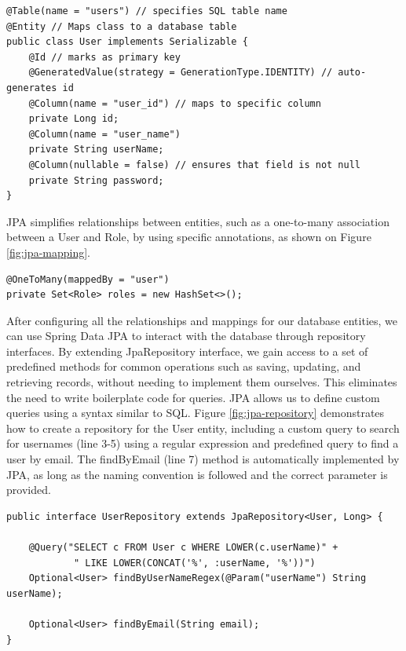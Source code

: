 {
\begin{verbatim}
@Table(name = "users") // specifies SQL table name
@Entity // Maps class to a database table
public class User implements Serializable {
    @Id // marks as primary key
    @GeneratedValue(strategy = GenerationType.IDENTITY) // auto-generates id
    @Column(name = "user_id") // maps to specific column
    private Long id;
    @Column(name = "user_name")
    private String userName;
    @Column(nullable = false) // ensures that field is not null
    private String password;
}
\end{verbatim}
\label{fig:jpa-table}
}

JPA simplifies relationships between entities, such as a one-to-many association between a User and Role, by using specific annotations, as shown on Figure \ref{fig:jpa-mapping}.
{
\begin{verbatim}
@OneToMany(mappedBy = "user")
private Set<Role> roles = new HashSet<>();
\end{verbatim}
\label{fig:jpa-mapping}
}

After configuring all the relationships and mappings for our database entities, we can use Spring Data JPA to interact with the database through repository interfaces. By extending JpaRepository interface, we gain access to a set of predefined methods for common operations such as saving, updating, and retrieving records, without needing to implement them ourselves. This eliminates the need to write boilerplate code for queries. JPA allows us to define custom queries using a syntax similar to SQL. Figure \ref{fig:jpa-repository} demonstrates how to create a repository for the User entity, including a custom query to search for usernames (line 3-5) using a regular expression and predefined query to find a user by email. The findByEmail (line 7) method is automatically implemented by JPA, as long as the naming convention is followed and the correct parameter is provided. 

{
\begin{verbatim}
public interface UserRepository extends JpaRepository<User, Long> {

    @Query("SELECT c FROM User c WHERE LOWER(c.userName)" +
            " LIKE LOWER(CONCAT('%', :userName, '%'))")
    Optional<User> findByUserNameRegex(@Param("userName") String userName);
    
    Optional<User> findByEmail(String email);
}
\end{verbatim}
\label{fig:jpa-repository}
}
